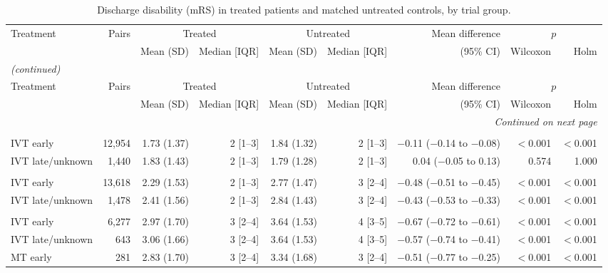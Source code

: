 \begin{landscape}
\begin{longtable}{p{5.6cm}rrrrrrrr}
\caption{Discharge disability (mRS) in treated patients and matched untreated controls, by trial group.}\label{tab:supp_discharge_disability}\\
\toprule
Treatment & Pairs & \multicolumn{2}{c}{Treated} & \multicolumn{2}{c}{Untreated} & Mean difference & \multicolumn{2}{c}{$p$} \\
\cmidrule(lr){3-4}\cmidrule(lr){5-6}\cmidrule(lr){8-9}
 & & Mean (SD) & Median [IQR] & Mean (SD) & Median [IQR] & (95\% CI) & Wilcoxon & Holm \\
\midrule
\endfirsthead
\multicolumn{9}{l}{\textit{(continued)}}\\
\toprule
Treatment & Pairs & \multicolumn{2}{c}{Treated} & \multicolumn{2}{c}{Untreated} & Mean difference & \multicolumn{2}{c}{$p$} \\
\cmidrule(lr){3-4}\cmidrule(lr){5-6}\cmidrule(lr){8-9}
 & & Mean (SD) & Median [IQR] & Mean (SD) & Median [IQR] & (95\% CI) & Wilcoxon & Holm \\
\midrule
\endhead
\midrule
\multicolumn{9}{r}{\textit{Continued on next page}}\\
\endfoot
\bottomrule
\endlastfoot
\multicolumn{9}{l}{\textbf{NIHSS 1--5}}\\
IVT early & 12,954 & 1.73 (1.37) & 2 [1--3] & 1.84 (1.32) & 2 [1--3] & $-$0.11 ($-$0.14 to $-$0.08) & $<$0.001 & $<$0.001 \\
IVT late/unknown & 1,440 & 1.83 (1.43) & 2 [1--3] & 1.79 (1.28) & 2 [1--3] & 0.04 ($-$0.05 to 0.13) & 0.574 & 1.000 \\
\addlinespace
\multicolumn{9}{l}{\textbf{NIHSS 6--10}}\\
IVT early & 13,618 & 2.29 (1.53) & 2 [1--3] & 2.77 (1.47) & 3 [2--4] & $-$0.48 ($-$0.51 to $-$0.45) & $<$0.001 & $<$0.001 \\
IVT late/unknown & 1,478 & 2.41 (1.56) & 2 [1--3] & 2.84 (1.43) & 3 [2--4] & $-$0.43 ($-$0.53 to $-$0.33) & $<$0.001 & $<$0.001 \\
\addlinespace
\multicolumn{9}{l}{\textbf{NIHSS 11--15}}\\
IVT early & 6,277 & 2.97 (1.70) & 3 [2--4] & 3.64 (1.53) & 4 [3--5] & $-$0.67 ($-$0.72 to $-$0.61) & $<$0.001 & $<$0.001 \\
IVT late/unknown & 643 & 3.06 (1.66) & 3 [2--4] & 3.64 (1.53) & 4 [3--5] & $-$0.57 ($-$0.74 to $-$0.41) & $<$0.001 & $<$0.001 \\
MT early & 281 & 2.83 (1.70) & 3 [2--4] & 3.34 (1.68) & 3 [2--4] & $-$0.51 ($-$0.77 to $-$0.25) & $<$0.001 & $<$0.001 \\

\end{longtable}
\end{landscape}
